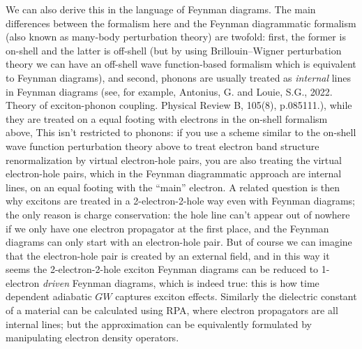 \documentclass[hyperref, a4paper]{article}
\begin{document}
We can also derive this in the language of Feynman diagrams.
The main differences between the formalism here and the Feynman diagrammatic formalism 
(also known as many-body perturbation theory) are twofold:
first, the former is on-shell and the latter is off-shell
(but by using Brillouin–Wigner perturbation theory 
we can have an off-shell wave function-based formalism
which is equivalent to Feynman diagrams), and second, 
phonons are usually treated as \emph{internal} lines in Feynman diagrams
(see, for example, Antonius, G. and Louie, S.G., 2022. Theory of exciton-phonon coupling. Physical Review B, 105(8), p.085111.), 
while they are treated on a equal footing with electrons 
in the on-shell formalism above,
This isn't restricted to phonons:
if you use a scheme similar to the on-shell wave function perturbation theory above 
to treat electron band structure renormalization by virtual electron-hole pairs, 
you are also treating the virtual electron-hole pairs, 
which in the Feynman diagrammatic approach are internal lines, 
on an equal footing with the ``main'' electron.
A related question is then why excitons are treated in a 2-electron-2-hole way even with Feynman diagrams; 
the only reason is charge conservation:
the hole line can't appear out of nowhere if we only have one electron propagator at the first place,
and the Feynman diagrams can only start with an electron-hole pair. 
But of course we can imagine that the electron-hole pair is created by an external field, 
and in this way it seems the 2-electron-2-hole exciton Feynman diagrams 
can be reduced to 1-electron \emph{driven} Feynman diagrams, 
which is indeed true: 
this is how time dependent adiabatic $GW$ captures exciton effects.
Similarly the dielectric constant of a material can be calculated using RPA, 
where electron propagators are all internal lines; 
but the approximation can be equivalently formulated 
by manipulating electron density operators.
\end{document}
